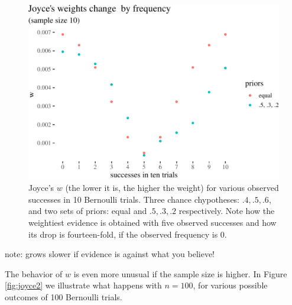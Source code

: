 \documentclass[
  10pt,
  dvipsnames,enabledeprecatedfontcommands]{scrartcl}
\begin{document}
\begin{figure}

\begin{center}\includegraphics[width=1\linewidth]{imprecision_weight_files/figure-latex/joyce1-1} \end{center}

\caption{Joyce's $w$ (the lower it is, the higher the weight) for various observed successes in 10 Bernoulli trials. Three chance chypotheses: $.4, .5, .6$, and two sets of priors: equal and $.5, .3, .2$ respectively. Note how the weightiest evidence is obtained with five observed successes and how its drop is fourteen-fold, if the observed frequency is 0.}
\label{fig:joyce1}
\end{figure}

note: grows slower if evidence is against what you believe!

The behavior of \(w\) is even more unusual if the sample size is higher.
In Figure \ref{fig:joyce2} we illustrate what happens with \(n=100\),
for various possible outcomes of 100 Bernoulli trials.
\end{document}
